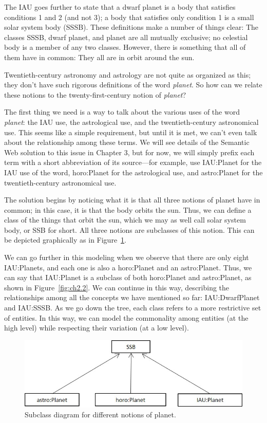 The IAU goes further to state that a dwarf planet is a body that
satisfies conditions 1 and 2 (and not 3); a body that satisfies only
condition 1 is a small solar system body (SSSB). These definitions make
a number of things clear: The classes SSSB, dwarf planet, and planet are
all mutually exclusive; no celestial body is a member of any two
classes. However, there is something that all of them have in common:
They all are in orbit around the sun.

Twentieth-century astronomy and astrology are not quite as organized as
this; they don't have such rigorous definitions of the word
\emph{planet}. So how can we relate these notions to the
twenty-first-century notion of \emph{planet}?

The first thing we need is a way to talk about the various uses of the
word \emph{planet}: the IAU use, the astrological use, and the
twentieth-century astronomical use. This seems like a simple
requirement, but until it is met, we can't even talk about the
relationship among these terms. We will see details of the Semantic Web
solution to this issue in Chapter 3, but for now, we will simply prefix
each term with a short abbreviation of its source---for example, use
IAU:Planet for the IAU use of the word, horo:Planet for the astrological
use, and astro:Planet for the twentieth-century astronomical use.

The solution begins by noticing what it is that all three notions of
planet have in common; in this case, it is that the body orbits the sun.
Thus, we can define a class of the things that orbit the sun, which we
may as well call solar system body, or SSB for short. All three notions
are subclasses of this notion. This can be depicted graphically as in
Figure~\ref{fig:ch2.1}.

We can go further in this modeling when we observe that there are only
eight IAU:Planets, and each one is also a horo:Planet and an
astro:Planet. Thus, we can say that IAU:Planet is a subclass of both
horo:Planet and astro:Planet, as shown in Figure~\ref{fig:ch2.2}. We can continue in
this way, describing the relationships among all the concepts we have
mentioned so far: IAU:DwarfPlanet and IAU:SSSB. As we go down the tree,
each class refers to a more restrictive set of entities. In this way, we
can model the commonality among entities (at the high level) while
respecting their variation (at a low level).


\begin{figure}
    \centering
    \includegraphics[width=5.0in]{SWWOv3/media/ch2/f02-01.jpg}
    \caption{Subclass diagram for different notions of planet.}
    \label{fig:ch2.1}
\end{figure}


